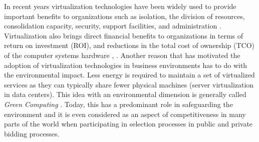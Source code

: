 	
	In recent years virtualization technologies have been widely used to provide important benefits to organizations such as isolation, the division of resources, consolidation capacity, security, support facilities, and administration \cite{Varasteh2017}.
	Virtualization also brings direct financial benefits to organizations in terms of return on investment (ROI), and reductions in the total cost of ownership (TCO) of the computer systems hardware \cite{Solis2014}, \cite{AbdElRahem2016}. Another reason that has motivated the adoption of virtualization technologies in business environments has to do with the environmental impact. 
	Less energy is required to maintain a set of virtualized services as they can typically share fewer physical machines (server virtualization in data centers). This idea with an environmental dimension is generally called \textit{Green Computing} \cite {Thathera2015, Ranjith2017, Jing2011}. Today, this has a predominant role in safeguarding the environment and it is even considered as an aspect of competitiveness in many parts of the world when participating in selection processes in public and private bidding processes.
	
	 
	

